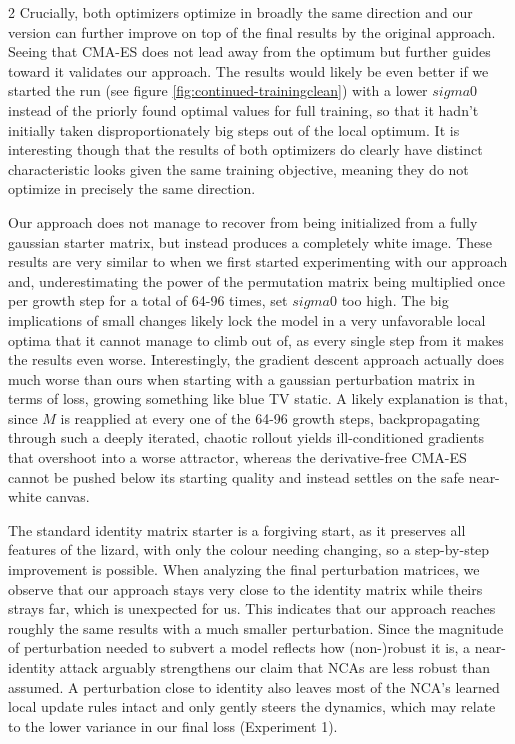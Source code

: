 \documentclass{article}
\begin{document}
\begin{multicols}{2}
Crucially, both optimizers optimize in broadly the same direction and our version can further improve on top of the final results by the original approach. Seeing that CMA-ES does not lead away from the optimum but further guides toward it validates our approach. The results would likely be even better if we started the run (see figure \ref{fig:continued-trainingclean}) with a lower $sigma0$ instead of the priorly found optimal values for full training, so that it hadn't initially taken disproportionately big steps out of the local optimum. It is interesting though that the results of both optimizers do clearly have distinct characteristic looks given the same training objective, meaning they do not optimize in precisely the same direction.

Our approach does not manage to recover from being initialized from a fully gaussian starter matrix, but instead produces a completely white image. These results are very similar to when we first started experimenting with our approach and, underestimating the power of the permutation matrix being multiplied once per growth step for a total of 64-96 times, set $sigma0$ too high. The big implications of small changes likely lock the model in a very unfavorable local optima that it cannot manage to climb out of, as every single step from it makes the results even worse. Interestingly, the gradient descent approach actually does much worse than ours when starting with a gaussian perturbation matrix in terms of loss, growing something like blue TV static. A likely explanation is that, since $M$ is reapplied at every one of the 64-96 growth steps, backpropagating through such a deeply iterated, chaotic rollout yields ill-conditioned gradients that overshoot into a worse attractor, whereas the derivative-free CMA-ES cannot be pushed below its starting quality and instead settles on the safe near-white canvas.


The standard identity matrix starter is a forgiving start, as it preserves all features of the lizard, with only the colour needing changing, so a step-by-step improvement is possible. When analyzing the final perturbation matrices, we observe that our approach stays very close to the identity matrix while theirs strays far, which is unexpected for us. This indicates that our approach reaches roughly the same results with a much smaller perturbation. Since the magnitude of perturbation needed to subvert a model reflects how (non-)robust it is, a near-identity attack arguably strengthens our claim that NCAs are less robust than assumed. A perturbation close to identity also leaves most of the NCA's learned local update rules intact and only gently steers the dynamics, which may relate to the lower variance in our final loss (Experiment 1).


\end{multicols}
\end{document}
